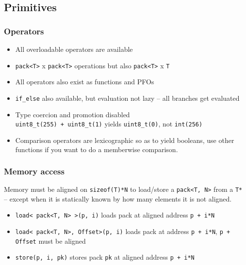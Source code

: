 \documentclass{beamer}
\begin{document}
\subsection{Primitives}

\begin{frame}
	\frametitle{Operators}
	
	\begin{itemize}
		\item All overloadable operators are available
		\item \lstinline{pack<T>} x \lstinline{pack<T>} operations but also \lstinline{pack<T>} x \lstinline{T}
		\item All operators also exist as functions and PFOs
		\item \lstinline{if_else} also available, but evaluation not lazy -- all branches get evaluated
		\item Type coercion and promotion disabled\\
		      \lstinline{uint8_t(255) + uint8_t(1)} yields \lstinline{uint8_t(0)}, not \lstinline{int(256)}
		\item Comparison operators are lexicographic so as to yield booleans,
		      use other functions if you want to do a memberwise comparison.
	\end{itemize}	
	
\end{frame}

\begin{frame}
	\frametitle{Memory access}
	
	Memory must be aligned on \lstinline{sizeof(T)*N} to load/store a \lstinline{pack<T, N>}
	from a \lstinline{T*}\\
	-- except when it is statically known by how many elements it is not aligned.
	
	\begin{itemize}
		\item \lstinline{load< pack<T, N> >(p, i)} loads pack at aligned address \lstinline{p + i*N}
		\item \lstinline{load< pack<T, N>, Offset>(p, i)} loads pack at address \lstinline{p + i*N}, \lstinline{p + Offset} must be aligned
		\item \lstinline{store(p, i, pk)} stores pack \lstinline{pk} at aligned address \lstinline{p + i*N}
	\end{itemize}
\end{frame}
\end{document}
